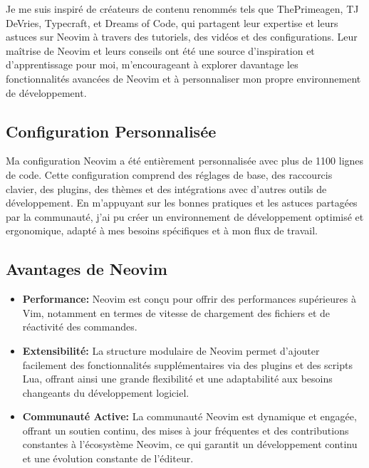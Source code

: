 \hspace{16pt}Je me suis inspiré de créateurs de contenu renommés tels que ThePrimeagen, TJ DeVries, Typecraft, et Dreams of Code, qui partagent leur expertise et leurs astuces sur Neovim à travers des tutoriels, des vidéos et des configurations. Leur maîtrise de Neovim et leurs conseils ont été une source d'inspiration et d'apprentissage pour moi, m'encourageant à explorer davantage les fonctionnalités avancées de Neovim et à personnaliser mon propre environnement de développement.

\subsection{Configuration Personnalisée}

\hspace{16pt}Ma configuration Neovim a été entièrement personnalisée avec plus de 1100 lignes de code. Cette configuration comprend des réglages de base, des raccourcis clavier, des plugins, des thèmes et des intégrations avec d'autres outils de développement. En m'appuyant sur les bonnes pratiques et les astuces partagées par la communauté, j'ai pu créer un environnement de développement optimisé et ergonomique, adapté à mes besoins spécifiques et à mon flux de travail.

\subsection{Avantages de Neovim}

\begin{itemize}
  \item \textbf{Performance: }Neovim est conçu pour offrir des performances supérieures à Vim, notamment en termes de vitesse de chargement des fichiers et de réactivité des commandes.
  \item \textbf{Extensibilité: }La structure modulaire de Neovim permet d'ajouter facilement des fonctionnalités supplémentaires via des plugins et des scripts Lua, offrant ainsi une grande flexibilité et une adaptabilité aux besoins changeants du développement logiciel.
  \item \textbf{Communauté Active: }La communauté Neovim est dynamique et engagée, offrant un soutien continu, des mises à jour fréquentes et des contributions constantes à l'écosystème Neovim, ce qui garantit un développement continu et une évolution constante de l'éditeur.
  
\end{itemize}


